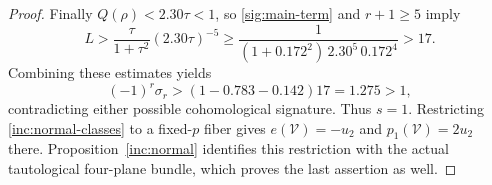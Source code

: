 \begin{proof}
Finally $Q(\rho)<2.30\tau<1$, so \eqref{sig:main-term}
and $r+1\ge5$ imply
\[
 L>\frac{\tau}{1+\tau^2}(2.30\tau)^{-5}
 \ge\frac{1}{(1+0.172^2)\,2.30^5\,0.172^4}>17.
\]
Combining these estimates yields
\[
 (-1)^r\sigma_r>(1-0.783-0.142)17=1.275>1,
\]
contradicting either possible cohomological signature. Thus $s=1$.
Restricting \eqref{inc:normal-classes} to a fixed-$p$ fiber
gives $e(\mathcal V)=-u_2$ and $p_1(\mathcal V)=2u_2$ there.
Proposition~\ref{inc:normal} identifies this restriction with
the actual tautological four-plane bundle, which proves the
last assertion as well.
\end{proof}
